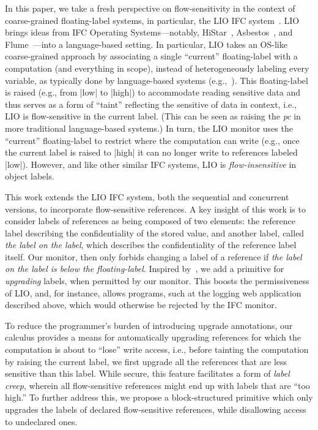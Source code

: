 In this paper, we take a fresh perspective on flow-sensitivity %
in the context of coarse-grained floating-label systems, in
particular, the LIO IFC system~\cite{stefan:lio,
stefan:addressing-covert}. %
%
LIO brings ideas from IFC Operating Systems---notably,
HiStar~\cite{zeldovich:histar}, Asbestos~\cite{Efstathopoulos:2005}, and
Flume~\cite{krohn:flume}---into a language-based setting.
%
In particular, LIO takes an OS-like coarse-grained approach by associating a
single ``current'' floating-label with a computation (and everything in scope),
instead of heterogeneously labeling every variable, as typically done by
language-based systems (e.g.,~\cite{jif,FlowCaml}).
%
This floating-label is raised (e.g., from |low| to |high|) to accommodate
reading sensitive data and thus serves as a form of ``taint'' reflecting the
sensitive of data in context, i.e., LIO is flow-sensitive in the current label.
%
(This can be seen as raising the \emph{pc} in more traditional language-based
systems.)
%
In turn, the LIO monitor uses the ``current'' floating-label to
restrict where the computation can write (e.g., once the current label
is raised to |high| it can no longer write to references labeled
|low|).
%
However, and like other similar IFC systems, LIO is \emph{flow-insensitive} in
object labels.

This work extends the LIO IFC system, both the sequential and concurrent
versions, to incorporate flow-sensitive references.
%
A key insight of this work is to consider labels of references as
being composed of two elements: the reference label describing the
confidentiality of the stored value, and another label, called
\emph{the label on the label}, which describes the confidentiality of
the reference label itself.
%
Our monitor, then only forbids changing a label of a reference if
\emph{the label on the label is below the floating-label}.
%
Inspired by~\cite{Hedin13}, we add a primitive for \emph{upgrading} labels,
when permitted by our monitor.
%
This boosts the permissiveness of LIO, and, for instance, allows programs, such
at the logging web application described above, which would otherwise be
rejected by the IFC monitor.

To reduce the programmer's burden of introducing upgrade annotations, our
calculus provides a means for automatically upgrading references for which the
computation is about to ``lose'' write access, i.e., before tainting the
computation by raising the current label, we first upgrade all the references
that are less sensitive than this label.
%
While secure, this feature facilitates a form of \emph{label creep},
wherein all flow-sensitive references might end up with labels that
are ``too high.''
%
To further address this, we propose a block-structured primitive which
only upgrades the labels of declared flow-sensitive references, while
disallowing access to undeclared ones.
 
